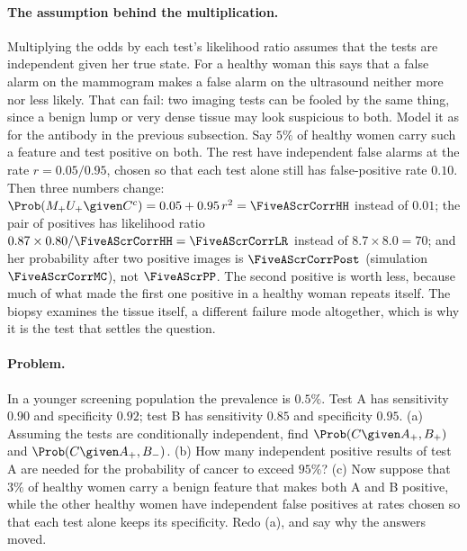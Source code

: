 \paragraph{The assumption behind the multiplication.}
Multiplying the odds by each test's likelihood ratio assumes that the tests are
independent given her true state. For a healthy woman this says that a false alarm
on the mammogram makes a false alarm on the ultrasound neither more nor less likely.
That can fail: two imaging tests can be fooled by the same thing, since a benign
lump or very dense tissue may look suspicious to both. Model it as for the antibody
in the previous subsection. Say $5\%$ of healthy women carry such a feature and test
positive on both. The rest have independent false alarms at the rate $r=0.05/0.95$,
chosen so that each test alone still has false-positive rate $0.10$. Then three
numbers change:
$\Prob(M_+U_+\given C^c)=0.05+0.95\,r^2=\FiveAScrCorrHH$ instead of $0.01$; the
pair of positives has likelihood ratio
$0.87\times0.80/\FiveAScrCorrHH=\FiveAScrCorrLR$ instead of $8.7\times8.0=70$; and
her probability after two positive images is $\FiveAScrCorrPost$ (simulation
$\FiveAScrCorrMC$), not $\FiveAScrPP$. The second positive is worth less, because
much of what made the first one positive in a healthy woman repeats itself. The biopsy
examines the tissue itself, a different failure mode altogether, which is why it is
the test that settles the question.

\paragraph{Problem.}
In a younger screening population the prevalence is $0.5\%$. Test A has sensitivity
$0.90$ and specificity $0.92$; test B has sensitivity $0.85$ and specificity $0.95$.
(a) Assuming the tests are conditionally independent, find $\Prob(C\given A_+,B_+)$ and
$\Prob(C\given A_+,B_-)$. (b) How many independent positive results of test A are
needed for the probability of cancer to exceed $95\%$? (c) Now suppose that $3\%$ of
healthy women carry a benign feature that makes both A and B positive, while the
other healthy women have independent false positives at rates chosen so that each test
alone keeps its specificity. Redo (a), and say why the answers moved.

